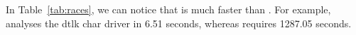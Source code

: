 
In Table~\ref{tab:races}, we can notice that \whoop is much faster than \corral. For example, \whoop analyses the dtlk char driver in 6.51 seconds, whereas \corral requires 1287.05 seconds.

